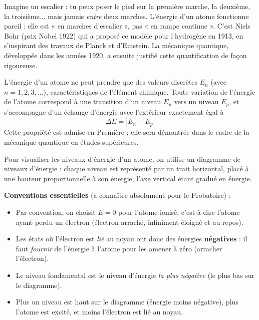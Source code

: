 \documentclass[11pt]{article}
\newcommand{\cle}[1]{{\popxbold\color{popdark}#1}}
\newcounter{popsec}
\newcounter{popsub}
\newcommand{\courssub}[1]{%
  \stepcounter{popsub}%
  \par\vspace{9pt}\noindent{\popxbold\fontsize{11.5}{13}\selectfont\color{popink}{\color{poporange}\thepopsec.\thepopsub}\hspace{6pt}#1}\par\nopagebreak\vspace{4pt}
}
\begin{document}
\begin{savaistu}
Imagine un escalier : tu peux poser le pied sur la première marche, la deuxième, la troisième... mais jamais \emph{entre} deux marches. L'énergie d'un atome fonctionne pareil : elle est « en marches d'escalier », pas « en rampe continue ». C'est Niels Bohr (prix Nobel 1922) qui a proposé ce modèle pour l'hydrogène en 1913, en s'inspirant des travaux de Planck et d'Einstein. La mécanique quantique, développée dans les années 1920, a ensuite justifié cette quantification de façon rigoureuse.
\end{savaistu}

\begin{propriete}
L'énergie d'un atome ne peut prendre que des valeurs discrètes $E_n$ (avec $n = 1, 2, 3, \ldots$), caractéristiques de l'élément chimique. Toute variation de l'énergie de l'atome correspond à une \cle{transition} d'un niveau $E_n$ vers un niveau $E_p$, et s'accompagne d'un échange d'énergie avec l'extérieur exactement égal à
\[ \Delta E = |E_n - E_p| \]
Cette propriété est admise en Première ; elle sera démontrée dans le cadre de la mécanique quantique en études supérieures.
\end{propriete}

\courssub{Le diagramme de niveaux d'énergie}

Pour visualiser les niveaux d'énergie d'un atome, on utilise un \cle{diagramme de niveaux d'énergie} : chaque niveau est représenté par un trait horizontal, placé à une hauteur proportionnelle à son énergie, l'axe vertical étant gradué en énergie.

\textbf{Conventions essentielles} (à connaître absolument pour le Probatoire) :
\begin{itemize}
\item Par convention, on choisit $E = 0$ pour l'atome \cle{ionisé}, c'est-à-dire l'atome ayant perdu un électron (électron arraché, infiniment éloigné et au repos).
\item Les états où l'électron est \emph{lié} au noyau ont donc des énergies \textbf{négatives} : il faut \emph{fournir} de l'énergie à l'atome pour les amener à zéro (arracher l'électron).
\item Le niveau fondamental est le niveau d'énergie \emph{la plus négative} (le plus bas sur le diagramme).
\item Plus un niveau est haut sur le diagramme (énergie moins négative), plus l'atome est excité, et moins l'électron est lié au noyau.
\end{itemize}
\end{document}
